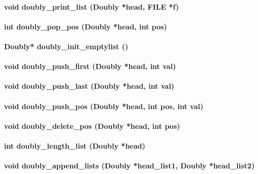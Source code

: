 {{\paragraph{void doubly\_print\_list (Doubly *head, FILE *f)\\}
\paragraph{int doubly\_pop\_pos (Doubly *head, int pos)\\}
\paragraph{Doubly* doubly\_init\_emptylist ()\\}
\paragraph{void doubly\_push\_first (Doubly *head, int val)\\}
\paragraph{void doubly\_push\_last (Doubly *head, int val)\\}
\paragraph {void doubly\_push\_pos (Doubly *head, int pos, int val)\\}
\paragraph{void doubly\_delete\_pos (Doubly *head, int pos)\\}
\paragraph{int doubly\_length\_list (Doubly *head)\\}
\paragraph{void doubly\_append\_lists (Doubly *head\_list1, Doubly *head\_list2)
\\}

}}
